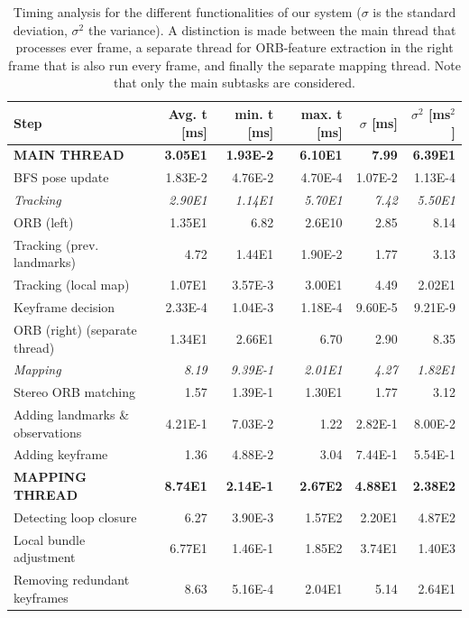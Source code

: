 \documentclass[a4paper, 10pt]{article}
\begin{document}
\begin{table}[htbp]
\caption{\label{tab:orgc29221d}
Timing analysis for the different functionalities of our system (\(\sigma\) is the standard deviation, \(\sigma^{\text{2}}\) the variance). A distinction is made between the main thread that processes ever frame, a separate thread for ORB-feature extraction in the right frame that is also run every frame, and finally the separate mapping thread. Note that only the main subtasks are considered.}
\centering
\begin{tabular}{lrrrrr}
Step & Avg. t [ms] & min. t [ms] & max. t [ms] & \(\sigma\)  [ms] & \(\sigma^{\text{2}}\) [ms\(^{\text{2}}\)]\\
\hline
\hline
\textbf{MAIN THREAD} & \textbf{3.05E1} & \textbf{1.93E-2} & \textbf{6.10E1} & \textbf{7.99} & \textbf{6.39E1}\\
BFS pose update & 1.83E-2 & 4.76E-2 & 4.70E-4 & 1.07E-2 & 1.13E-4\\
\hline
\emph{Tracking} & \emph{2.90E1} & \emph{1.14E1} & \emph{5.70E1} & \emph{7.42} & \emph{5.50E1}\\
ORB (left) & 1.35E1 & 6.82 & 2.6E10 & 2.85 & 8.14\\
Tracking (prev. landmarks) & 4.72 & 1.44E1 & 1.90E-2 & 1.77 & 3.13\\
Tracking (local map) & 1.07E1 & 3.57E-3 & 3.00E1 & 4.49 & 2.02E1\\
Keyframe decision & 2.33E-4 & 1.04E-3 & 1.18E-4 & 9.60E-5 & 9.21E-9\\
\hline
ORB (right) (separate thread) & 1.34E1 & 2.66E1 & 6.70 & 2.90 & 8.35\\
\hline
\emph{Mapping} & \emph{8.19} & \emph{9.39E-1} & \emph{2.01E1} & \emph{4.27} & \emph{1.82E1}\\
Stereo ORB matching & 1.57 & 1.39E-1 & 1.30E1 & 1.77 & 3.12\\
Adding landmarks \& observations & 4.21E-1 & 7.03E-2 & 1.22 & 2.82E-1 & 8.00E-2\\
Adding keyframe & 1.36 & 4.88E-2 & 3.04 & 7.44E-1 & 5.54E-1\\
\hline
\hline
\textbf{MAPPING THREAD} & \textbf{8.74E1} & \textbf{2.14E-1} & \textbf{2.67E2} & \textbf{4.88E1} & \textbf{2.38E2}\\
Detecting loop closure & 6.27 & 3.90E-3 & 1.57E2 & 2.20E1 & 4.87E2\\
Local bundle adjustment & 6.77E1 & 1.46E-1 & 1.85E2 & 3.74E1 & 1.40E3\\
Removing redundant keyframes & 8.63 & 5.16E-4 & 2.04E1 & 5.14 & 2.64E1\\
\end{tabular}
\end{table}
\end{document}
